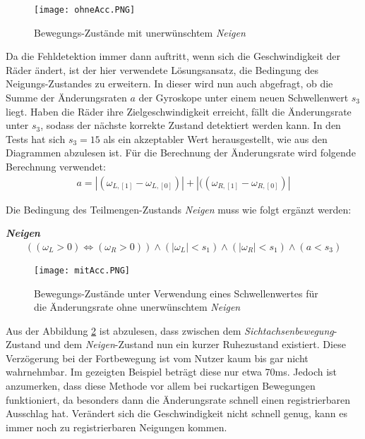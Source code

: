 \begin{figure}[h]
    \centering
    \texttt{[image: ohneAcc.PNG]}
    \caption{Bewegungs-Zustände mit unerwünschtem \textit{Neigen}}
    \label{fig:ohneAcc}
\end{figure}

Da die Fehldetektion immer dann auftritt, wenn sich die Geschwindigkeit der Räder ändert, ist der hier verwendete Lösungsansatz, die Bedingung des Neigungs-Zustandes zu erweitern.
In dieser wird nun auch abgefragt, ob die Summe der Änderungsraten $a$ der Gyroskope unter einem neuen Schwellenwert $s_3$ liegt.
Haben die Räder ihre Zielgeschwindigkeit erreicht, fällt die Änderungsrate unter $s_3$, sodass der nächste korrekte Zustand detektiert werden kann.
In den Tests hat sich $s_3 = 15$ als ein akzeptabler Wert herausgestellt, wie aus den Diagrammen abzulesen ist.
Für die Berechnung der Änderungsrate wird folgende Berechnung verwendet:
\begin{align}
    a = |(\omega_{L,[1]} - \omega_{L,[0]})| + |((\omega_{R,[1]} - \omega_{R,[0]})|
\end{align}

Die Bedingung des Teilmengen-Zustands \textit{Neigen} muss wie folgt ergänzt werden:

\textbf{\textit{Neigen}}
\begin{align}
    ((\omega_L > 0) \Leftrightarrow (\omega_R > 0)) \land (|\omega_L| < s_1) \land (|\omega_R| < s_1) \land (a < s_3)
\end{align}


\begin{figure}[h]
    \centering
    \texttt{[image: mitAcc.PNG]}
    \caption{Bewegungs-Zustände unter Verwendung eines Schwellenwertes für die Änderungsrate ohne unerwünschtem \textit{Neigen}}
    \label{fig:mitAcc}
\end{figure}

Aus der Abbildung \ref{fig:mitAcc} ist abzulesen, dass zwischen dem \textit{Sichtachsenbewegung}-Zustand und dem \textit{Neigen}-Zustand nun ein kurzer Ruhezustand existiert.
Diese Verzögerung bei der Fortbewegung ist vom Nutzer kaum bis gar nicht wahrnehmbar.
Im gezeigten Beispiel beträgt diese nur etwa 70ms.
Jedoch ist anzumerken, dass diese Methode vor allem bei ruckartigen Bewegungen funktioniert, da besonders dann die Änderungsrate schnell einen registrierbaren Ausschlag hat.
Verändert sich die Geschwindigkeit nicht schnell genug, kann es immer noch zu registrierbaren Neigungen kommen.

